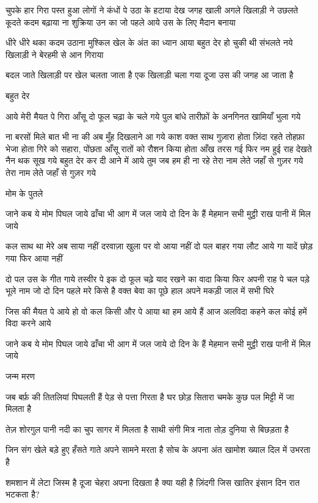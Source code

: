 चुपके हार गिरा पस्त हुआ
लोगों ने कंधों पे उठा के हटाया
देख जगह खाली अगले खिलाड़ी ने
उछलते कूदते कदम बढ़ाया
ना शुक्रिया उन का जो पहले आये
उस के लिए मैदान बनाया





धीरे धीरे थका कदम उठाना मुश्किल
खेल के अंत का ध्यान आया 
बहुत देर हो चुकी थी संभलते
नये खिलाड़ी ने बेरहमी से आन गिराया

बदल जाते खिलाड़ी पर
खेल चलता जाता है
एक खिलाड़ी चला गया
दूजा उस की जगह आ जाता है


बहुत देर

आये मेरी मैयत पे गिरा आँसू
दो फूल चढ़ा के चले गये
पुल बांधे तारीफ़ों के
अनगिनत खामियाँ भुला गये





ना बरसों मिले बात भी ना की
अब मुँह दिखलाने आ गये
काश वक्त साथ गुज़ारा होता
ज़िंदा रहते तोहफ़ा भेजा होता
गिरे को सहारा, पोंछता आँसू
रातों को रौशन किया होता
आँख तरस गई फिर नम हुई
राह देखते नैन थक सूख गये
बहुत देर कर दी आने में
आये तुम जब हम ही ना रहे
तेरा नाम लेते जहाँ से गुज़र गये
तेरा नाम लेते जहाँ से गुज़र गये


मोम के पुतले

जाने कब ये मोम पिघल जाये
ढाँचा भी आग में जल जाये
दो दिन के हैं मेहमान सभी
मुट्ठी राख पानी में मिल जाये

कल साथ था मेरे अब साया नहीं
दरवाज़ा खुला पर वो आया नहीं
दो पल बाहर गया लौट आये गा
यादें छोड़ गया फिर आया नहीं

दो पल उस के गीत गाये
तस्वीर पे इक दो फूल चढ़े 
याद रखने का वादा किया
फिर अपनी राह पे चल पड़े
भूले नाम जो दो दिन पहले मरे
किसे है वक्त बेवा का पूछे हाल
अपने मकड़ी जाल में सभी घिरे

जिस की मैयत पे आये हो
वो कल किसी और पे आया था
हम आये हैं आज अलविदा कहने
कल कोई हमें विदा करने आये



जाने कब ये मोम पिघल जाये
ढाँचा भी आग में जल जाये
दो दिन के हैं मेहमान सभी
मुट्ठी राख पानी में मिल जाये




जन्म मरण

जब बर्फ़ की तितलियां पिघलती हैं
पेड़ से पत्ता गिरता है
घर छोड़ सितारा चमके कुछ पल
मिट्टी में जा मिलता है

तेज़ शोरगुल पानी नदी का
चुप सागर में मिलता है
साथी संगी मित्र नाता तोड़
दुनिया से बिछड़ता है


जिन संग खेले बड़े हुए हँसते गाते
अपने सामने मरता है
सोच के अपना अंत
खामोश ख्याल दिल में उभरता है

शमशान में लेटा जिस्म है दूजा
चेहरा अपना दिखता है
क्या यही है ज़िंदगी जिस खातिर
इंसान दिन रात भटकता है?



